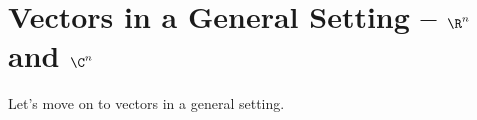 \chapter{Vectors in a General Setting -- $\R^n$ and $\C^n$}

Let's move on to vectors in a general setting.

